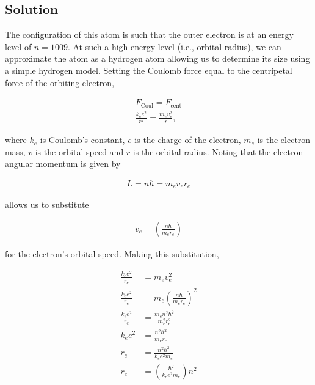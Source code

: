 \documentclass[12pt]{article}
\begin{document}

\subsection*{Solution}

The configuration of this atom is such that the outer electron is at an energy level of $n=1009$. At such a high energy level (i.e., orbital radius), we can approximate the atom as a hydrogen atom allowing us to determine its size using a simple hydrogen model. Setting the Coulomb force equal to the centripetal force of the orbiting electron,

\begin{align*}
F_\mathrm{Coul} = F_\mathrm{cent} \\
\frac{k_ee^2}{r^2} = \frac{m_ev_e^2}{r},
\end{align*}

where $k_e$ is Coulomb's constant, $e$ is the charge of the electron, $m_e$ is the electron mass, $v$ is the orbital speed and $r$ is the orbital radius. Noting that the electron angular momentum is given by 
 
\begin{align*}
L = n\hbar = m_ev_er_e
\end{align*}

allows us to substitute

\begin{align*}
v_e = \left( \frac{n\hbar}{m_er_e} \right)
\end{align*}

for the electron's orbital speed. Making this substitution,

\begin{equation*}
\begin{split}
\frac{k_ee^2}{r_e} &= m_ev_e^2 \\
\frac{k_ee^2}{r_e} &= m_e \left(\frac{n\hbar}{m_er_e}\right)^2 \\
\frac{k_ee^2}{r_e} &= \frac{m_en^2\hbar^2}{m_e^2r_e^2} \\
k_ee^2 &= \frac{n^2\hbar^2}{m_er_e} \\
r_e &= \frac{n^2\hbar^2}{k_ee^2m_e} \\
r_e &= \left(\frac{\hbar^2}{k_ee^2m_e}\right) n^2
\end{split}
\end{equation*}
\end{document}
